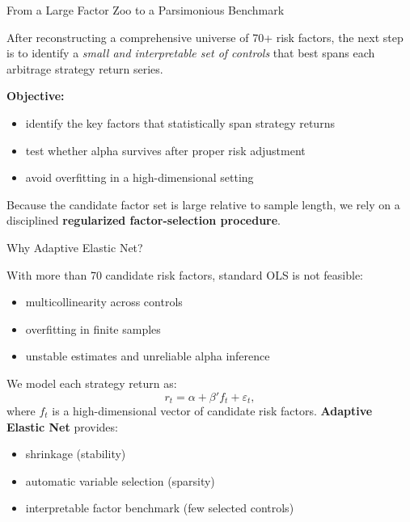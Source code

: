 \documentclass[aspectratio=169,11pt]{beamer}
\begin{document}
\begin{frame}{From a Large Factor Zoo to a Parsimonious Benchmark}
\small

After reconstructing a comprehensive universe of 70+ risk factors, 
the next step is to identify a \textit{small and interpretable set of controls}
that best spans each arbitrage strategy return series.

\vspace{0.3cm}

\textbf{Objective:}

\begin{itemize}
    \item identify the key factors that statistically span strategy returns
    \item test whether alpha survives after proper risk adjustment
    \item avoid overfitting in a high-dimensional setting
\end{itemize}

\vspace{0.3cm}

Because the candidate factor set is large relative to sample length, we rely on a disciplined \textbf{regularized factor-selection procedure}.
\end{frame}

\begin{frame}{Why Adaptive Elastic Net? \citep{zou2009adaptive}} 
  
\small With more than 70 candidate risk factors, standard OLS is not feasible: 
\begin{itemize} 
  \item multicollinearity across controls 
  \item overfitting in finite samples 
  \item unstable estimates and unreliable alpha inference 
\end{itemize} 

\vspace{0.3cm} 

We model each strategy return as: \[ r_{t} = \alpha + \beta' f_{t} + \varepsilon_{t}, \] where $f_t$ is a high-dimensional vector of candidate risk factors. 
\vspace{0.3cm} 
\textbf{Adaptive Elastic Net} \citep{zou2009adaptive} provides: 
\begin{itemize} 
  \item shrinkage (stability) 
  \item automatic variable selection (sparsity) 
  \item interpretable factor benchmark (few selected controls) 
\end{itemize} 

\end{frame}
\end{document}
